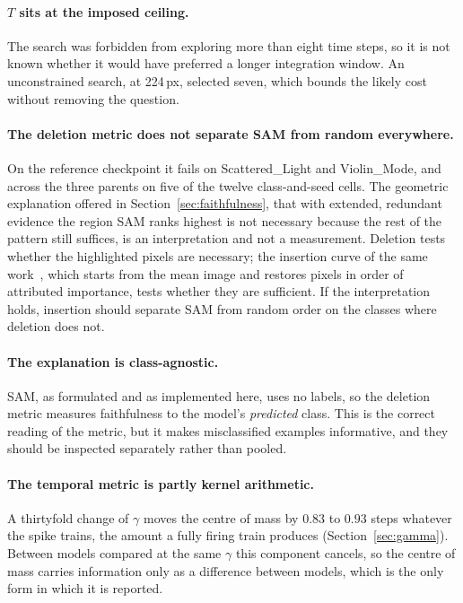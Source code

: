 \paragraph{$T$ sits at the imposed ceiling.} The search was forbidden from
exploring more than eight time steps, so it is not known whether it would have
preferred a longer integration window. An unconstrained search, at 224\,px,
selected seven, which bounds the likely cost without removing the question.

\paragraph{The deletion metric does not separate SAM from random everywhere.} On
the reference checkpoint it fails on Scattered\_Light and Violin\_Mode, and
across the three parents on five of the twelve class-and-seed cells. The
geometric explanation offered in Section~\ref{sec:faithfulness}, that with
extended, redundant evidence the region SAM ranks highest is not necessary
because the rest of the pattern still suffices, is an interpretation and not a
measurement. Deletion tests whether the highlighted pixels are necessary; the
insertion curve of the same work~\cite{petsiuk2018rise}, which starts from the
mean image and restores pixels in order of attributed importance, tests whether
they are sufficient. If the interpretation holds, insertion should separate SAM
from random order on the classes where deletion does not.

\paragraph{The explanation is class-agnostic.} SAM, as formulated and as
implemented here, uses no labels, so the deletion metric measures faithfulness
to the model's \emph{predicted} class. This is the correct reading of the metric,
but it makes misclassified examples informative, and they should be inspected
separately rather than pooled.

\paragraph{The temporal metric is partly kernel arithmetic.} A thirtyfold change
of $\gamma$ moves the centre of mass by $0.83$ to $0.93$ steps whatever the spike
trains, the amount a fully firing train produces (Section~\ref{sec:gamma}).
Between models compared at the same $\gamma$ this component cancels, so the
centre of mass carries information only as a difference between models, which
is the only form in which it is reported.

